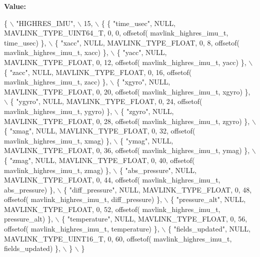 {\bfseries Value\+:}
\begin{DoxyCode}
\{ \(\backslash\)
    \textcolor{stringliteral}{"HIGHRES\_IMU"}, \(\backslash\)
    15, \(\backslash\)
    \{  \{ \textcolor{stringliteral}{"time\_usec"}, NULL, MAVLINK_TYPE_UINT64_T, 0, 0, offsetof(
      mavlink_highres_imu_t, time\_usec) \}, \(\backslash\)
         \{ \textcolor{stringliteral}{"xacc"}, NULL, MAVLINK_TYPE_FLOAT, 0, 8, offsetof(
      mavlink_highres_imu_t, xacc) \}, \(\backslash\)
         \{ \textcolor{stringliteral}{"yacc"}, NULL, MAVLINK_TYPE_FLOAT, 0, 12, offsetof(
      mavlink_highres_imu_t, yacc) \}, \(\backslash\)
         \{ \textcolor{stringliteral}{"zacc"}, NULL, MAVLINK_TYPE_FLOAT, 0, 16, offsetof(
      mavlink_highres_imu_t, zacc) \}, \(\backslash\)
         \{ \textcolor{stringliteral}{"xgyro"}, NULL, MAVLINK_TYPE_FLOAT, 0, 20, offsetof(
      mavlink_highres_imu_t, xgyro) \}, \(\backslash\)
         \{ \textcolor{stringliteral}{"ygyro"}, NULL, MAVLINK_TYPE_FLOAT, 0, 24, offsetof(
      mavlink_highres_imu_t, ygyro) \}, \(\backslash\)
         \{ \textcolor{stringliteral}{"zgyro"}, NULL, MAVLINK_TYPE_FLOAT, 0, 28, offsetof(
      mavlink_highres_imu_t, zgyro) \}, \(\backslash\)
         \{ \textcolor{stringliteral}{"xmag"}, NULL, MAVLINK_TYPE_FLOAT, 0, 32, offsetof(
      mavlink_highres_imu_t, xmag) \}, \(\backslash\)
         \{ \textcolor{stringliteral}{"ymag"}, NULL, MAVLINK_TYPE_FLOAT, 0, 36, offsetof(
      mavlink_highres_imu_t, ymag) \}, \(\backslash\)
         \{ \textcolor{stringliteral}{"zmag"}, NULL, MAVLINK_TYPE_FLOAT, 0, 40, offsetof(
      mavlink_highres_imu_t, zmag) \}, \(\backslash\)
         \{ \textcolor{stringliteral}{"abs\_pressure"}, NULL, MAVLINK_TYPE_FLOAT, 0, 44, offsetof(
      mavlink_highres_imu_t, abs\_pressure) \}, \(\backslash\)
         \{ \textcolor{stringliteral}{"diff\_pressure"}, NULL, MAVLINK_TYPE_FLOAT, 0, 48, offsetof(
      mavlink_highres_imu_t, diff\_pressure) \}, \(\backslash\)
         \{ \textcolor{stringliteral}{"pressure\_alt"}, NULL, MAVLINK_TYPE_FLOAT, 0, 52, offsetof(
      mavlink_highres_imu_t, pressure\_alt) \}, \(\backslash\)
         \{ \textcolor{stringliteral}{"temperature"}, NULL, MAVLINK_TYPE_FLOAT, 0, 56, offsetof(
      mavlink_highres_imu_t, temperature) \}, \(\backslash\)
         \{ \textcolor{stringliteral}{"fields\_updated"}, NULL, MAVLINK_TYPE_UINT16_T, 0, 60, offsetof(
      mavlink_highres_imu_t, fields\_updated) \}, \(\backslash\)
         \} \(\backslash\)
\}
\end{DoxyCode}
\mbox{\label{mavlink__msg__highres__imu_8h_ad477b2b6c88abba3d5838ca03c45daa7}} 
